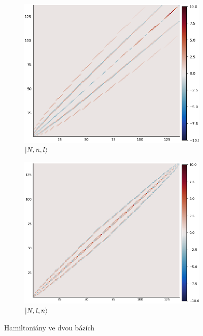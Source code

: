 \documentclass{article}
\begin{document}
\begin{figure}[H]
    \centering
    \begin{subfigure}{.5\textwidth}
      \centering
      \includegraphics[width=.95\linewidth]{Nnl.png}
      \caption{$\ket{N,n,l}$}
      \label{fig:sub1}
    \end{subfigure}%
    \begin{subfigure}{.5\textwidth}
      \centering
      \includegraphics[width=.95\linewidth]{Nln.png}
      \caption{$\ket{N,l,n}$}
      \label{fig:sub2}
    \end{subfigure}
    \caption{Hamiltoniány ve dvou bázích}
    \label{fig:test}
    \end{figure}
\end{document}
